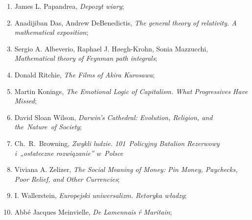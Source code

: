 \documentclass[a4paper,11pt]{article}
\begin{document}
\begin{enumerate}
\item James L. Papandrea, \emph{Depozyt wiary};

\item Anadijiban Das, Andrew DeBenedictis, \textit{The general theory of relativity. A mathematical exposition};

\item Sergio A. Albeverio, Raphael J. H\o egh-Krohn, Sonia Mazzucchi, \textit{Mathematical theory of Feynman path integrals};




\item Donald Ritchie, \emph{The Films of Akira Kurosawa};

\item Martin Konings, \emph{The Emotional Logic of Capitalism. What
    Progressives Have Missed};

\item David Sloan Wilson, \emph{Darwin's Cathedral: Evolution,
    Religion, and the~Nature~of Society};

\item Ch.~R.~Browning, \emph{Zwykli ludzie. 101~Policyjny Batalion
    Rezerwowy i~„ostateczne rozwiązanie” w~Polsce}

\item Viviana A. Zelizer, \emph{The Social Meaning of Money: Pin
    Money, Paychecks, Poor Relief, and Other Currencies};








\item I. Wallerstein, \emph{Europejski uniwersalizm. Retoryka władzy};

\item Abbé Jacques Meinvielle, \emph{De Lamennais ŕ Maritain};


\end{enumerate}
\end{document}
